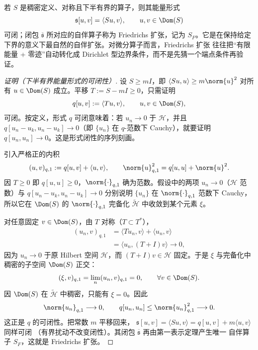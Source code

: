 \begin{definition}[Friedrichs 扩张]
若 $S$ 是稠密定义、对称且下半有界的算子，则其能量形式
\[
 \mathfrak s[u,v]=\langle Su,v\rangle,
 \qquad u,v\in\Dom(S)
\]
可闭；闭包 $\overline{\mathfrak s}$ 所对应的自伴算子称为 Friedrichs 扩张，记为 $S_F$。它是在保持给定下界的意义下最自然的自伴扩张。对微分算子而言，Friedrichs 扩张 往往把“有限能量 + 零迹”自动转化成 Dirichlet 型边界条件，而不是先猜一个端点条件再验证。
\end{definition}

\begin{proof}[证明（下半有界能量形式的可闭性）]
设 $S\ge mI$，即 $\langle Su,u\rangle\ge m\norm{u}^2$ 对所有 $u\in\Dom(S)$ 成立。平移
$T:=S-mI\ge0$，只需证明
\[
 q[u,v]:=\langle Tu,v\rangle,
 \qquad u,v\in\Dom(S),
\]
可闭。按定义，形式 $q$ 可闭意味着：若 $u_n\to0$ 于 $\mathcal H$，并且
$q[u_n-u_k,u_n-u_k]\to0$（即 $\{u_n\}$ 在 $q$-范数下 Cauchy），就要证明
$q[u_n,u_n]\to0$。这是形式闭性的序列刻画。

引入严格正的内积
\[
 (u,v)_{q,1}:=q[u,v]+\langle u,v\rangle,
 \qquad
 \norm{u}_{q,1}^2=q[u,u]+\norm{u}^2.
\]
因 $T\ge0$ 即 $q[u,u]\ge0$，$\norm{\cdot}_{q,1}$ 确为范数。假设中的两项
$u_n\to0$（$\mathcal H$ 范数）与 $q[u_n-u_k,u_n-u_k]\to0$ 分别说明 $\{u_n\}$ 在
$\norm{\cdot}_{q,1}$ 范数下 Cauchy，所以它在 $\Dom(S)$ 的 $\norm{\cdot}_{q,1}$ 完备化
$\widetilde{\mathcal H}$ 中收敛到某个元素 $\xi$。

对任意固定 $v\in\Dom(S)$，由 $T$ 对称（$T\subset T^*$），
\begin{align*}
 (u_n,v)_{q,1}
 &=\langle Tu_n,v\rangle+\langle u_n,v\rangle\\
 &=\langle u_n,(T+I)v\rangle
 \longrightarrow0,
\end{align*}
因为 $u_n\to0$ 于原 Hilbert 空间 $\mathcal H$，而 $(T+I)v\in\mathcal H$ 固定。于是
$\xi$ 与完备化中稠密的子空间 $\Dom(S)$ 正交：
\[
 (\xi,v)_{q,1}=\lim_n(u_n,v)_{q,1}=0,\qquad\forall v\in\Dom(S).
\]
因 $\Dom(S)$ 在 $\widetilde{\mathcal H}$ 中稠密，只能有 $\xi=0$。因此
\[
 \norm{u_n}_{q,1}\longrightarrow0,
 \qquad
 q[u_n,u_n]\le\norm{u_n}_{q,1}^2\longrightarrow0.
\]
这正是 $q$ 的可闭性。把常数 $m$ 平移回来，
$\mathfrak s[u,v]=\langle Su,v\rangle=q[u,v]+m\langle u,v\rangle$ 同样可闭
（有界扰动不改变闭性）。其闭包 $\overline{\mathfrak s}$ 再由第一表示定理产生唯一
自伴算子 $S_F$，这就是 Friedrichs 扩张。
\end{proof}


